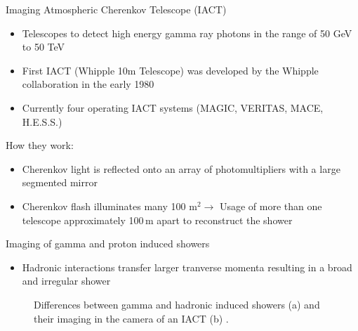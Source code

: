 \documentclass[aspectratio=1610, 10pt]{beamer}
\begin{document}
\begin{frame}{Imaging Atmospheric Cherenkov Telescope (IACT)}
  \begin{itemize}
    \item Telescopes to detect high energy gamma ray photons in the range of 50 GeV to 50 TeV
    \medskip
    \item First IACT (Whipple 10m Telescope) was developed by the Whipple collaboration in the early 1980
    \medskip
    \item Currently four operating IACT systems (MAGIC, VERITAS, MACE, H.E.S.S.)
  \end{itemize}
\vspace{0.5cm}
How they work:
\begin{itemize}
  \item Cherenkov light is reflected onto an array of photomultipliers with a large segmented mirror
  \medskip
  \item Cherenkov flash illuminates many 100 $\mathrm{m}^2 \rightarrow$ Usage of more than one telescope approximately 100$\, \mathrm{m}$ apart to
  reconstruct the shower
\end{itemize}
\end{frame}

\begin{frame}{Imaging of gamma and proton induced showers}
  \begin{itemize}
    \item Hadronic interactions transfer larger tranverse momenta resulting in a broad and irregular shower
  \end{itemize}
  \begin{figure}
      \hspace{0.5cm}
      \caption{Differences between gamma and hadronic induced showers (a)  and their imaging in the camera of an IACT (b) \cite{iact}.}
  \end{figure}
\end{frame}
\end{document}
